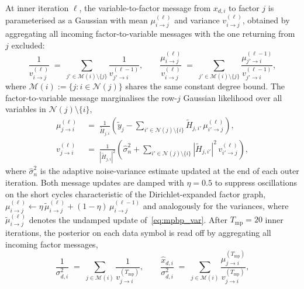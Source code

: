 At inner iteration $\ell$, the variable-to-factor message from $x_{d,i}$ to factor $j$ is parameterised as a Gaussian with mean $\mu_{i \to j}^{(\ell)}$ and variance $v_{i \to j}^{(\ell)}$, obtained by aggregating all incoming factor-to-variable messages with the one returning from $j$ excluded:
\begin{equation}
\frac{1}{v_{i \to j}^{(\ell)}} \;=\; \!\sum_{j' \in \mathcal{M}(i) \setminus \{j\}}\! \frac{1}{v_{j' \to i}^{(\ell-1)}}, \qquad \frac{\mu_{i \to j}^{(\ell)}}{v_{i \to j}^{(\ell)}} \;=\; \!\sum_{j' \in \mathcal{M}(i) \setminus \{j\}}\! \frac{\mu_{j' \to i}^{(\ell-1)}}{v_{j' \to i}^{(\ell-1)}}, \label{eq:mpbp_var}
\end{equation}
where $\mathcal{M}(i) := \{j : i \in \mathcal{N}(j)\}$ shares the same constant degree bound. The factor-to-variable message marginalises the row-$j$ Gaussian likelihood over all variables in $\mathcal{N}(j) \setminus \{i\}$,
\begin{align}
\mu_{j \to i}^{(\ell)} &\;=\; \frac{1}{\tilde{H}_{j,i}} \left( \tilde{y}_j - \!\!\sum_{i' \in \mathcal{N}(j) \setminus \{i\}}\!\! \tilde{H}_{j, i'}\, \mu_{i' \to j}^{(\ell)} \right),
\label{eq:mpbp_fact_mean} \\
v_{j \to i}^{(\ell)} &\;=\; \frac{1}{|\tilde{H}_{j,i}|^2} \left( \hat{\sigma}_n^2 + \!\!\sum_{i' \in \mathcal{N}(j) \setminus \{i\}}\!\! |\tilde{H}_{j, i'}|^2\, v_{i' \to j}^{(\ell)} \right), \label{eq:mpbp_fact_var}
\end{align}
where $\hat{\sigma}_n^2$ is the adaptive noise-variance estimate updated at the end of each outer iteration. Both message updates are damped with $\eta = 0.5$ to suppress oscillations on the short cycles characteristic of the Dirichlet-expanded factor graph, $\mu_{i \to j}^{(\ell)} \leftarrow \eta\, \tilde{\mu}_{i \to j}^{(\ell)} + (1-\eta)\, \mu_{i \to j}^{(\ell-1)}$ and analogously for the variances, where $\tilde{\mu}_{i \to j}^{(\ell)}$ denotes the undamped update of~\eqref{eq:mpbp_var}. After $T_\text{mp} = 20$ inner iterations, the posterior on each data symbol is read off by aggregating all incoming factor messages,
\begin{equation}
\frac{1}{\sigma_{d,i}^2} \;=\; \!\sum_{j \in \mathcal{M}(i)}\! \frac{1}{v_{j \to i}^{(T_\text{mp})}}, \qquad \frac{\hat{x}_{d,i}}{\sigma_{d,i}^2} \;=\; \!\sum_{j \in \mathcal{M}(i)}\! \frac{\mu_{j \to i}^{(T_\text{mp})}}{v_{j \to i}^{(T_\text{mp})}}, \label{eq:mpbp_post}
\end{equation}
